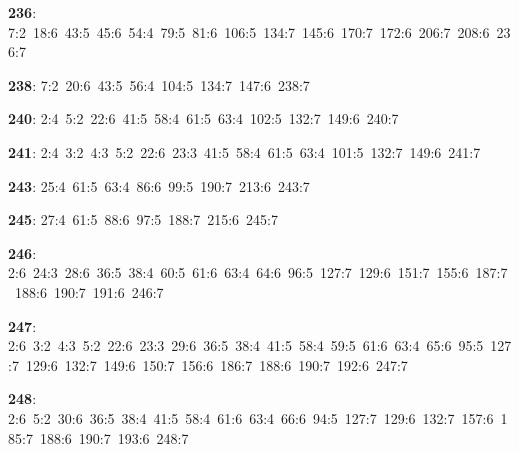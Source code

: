 \noindent \textbf{236}: 7:2\allowbreak\ 18:6\allowbreak\ 43:5\allowbreak\ 45:6\allowbreak\ 54:4\allowbreak\ 79:5\allowbreak\ 81:6\allowbreak\ 106:5\allowbreak\ 134:7\allowbreak\ 145:6\allowbreak\ 170:7\allowbreak\ 172:6\allowbreak\ 206:7\allowbreak\ 208:6\allowbreak\ 236:7\par
\noindent \textbf{238}: 7:2\allowbreak\ 20:6\allowbreak\ 43:5\allowbreak\ 56:4\allowbreak\ 104:5\allowbreak\ 134:7\allowbreak\ 147:6\allowbreak\ 238:7\par
\noindent \textbf{240}: 2:4\allowbreak\ 5:2\allowbreak\ 22:6\allowbreak\ 41:5\allowbreak\ 58:4\allowbreak\ 61:5\allowbreak\ 63:4\allowbreak\ 102:5\allowbreak\ 132:7\allowbreak\ 149:6\allowbreak\ 240:7\par
\noindent \textbf{241}: 2:4\allowbreak\ 3:2\allowbreak\ 4:3\allowbreak\ 5:2\allowbreak\ 22:6\allowbreak\ 23:3\allowbreak\ 41:5\allowbreak\ 58:4\allowbreak\ 61:5\allowbreak\ 63:4\allowbreak\ 101:5\allowbreak\ 132:7\allowbreak\ 149:6\allowbreak\ 241:7\par
\noindent \textbf{243}: 25:4\allowbreak\ 61:5\allowbreak\ 63:4\allowbreak\ 86:6\allowbreak\ 99:5\allowbreak\ 190:7\allowbreak\ 213:6\allowbreak\ 243:7\par
\noindent \textbf{245}: 27:4\allowbreak\ 61:5\allowbreak\ 88:6\allowbreak\ 97:5\allowbreak\ 188:7\allowbreak\ 215:6\allowbreak\ 245:7\par
\noindent \textbf{246}: 2:6\allowbreak\ 24:3\allowbreak\ 28:6\allowbreak\ 36:5\allowbreak\ 38:4\allowbreak\ 60:5\allowbreak\ 61:6\allowbreak\ 63:4\allowbreak\ 64:6\allowbreak\ 96:5\allowbreak\ 127:7\allowbreak\ 129:6\allowbreak\ 151:7\allowbreak\ 155:6\allowbreak\ 187:7\allowbreak\ 188:6\allowbreak\ 190:7\allowbreak\ 191:6\allowbreak\ 246:7\par
\noindent \textbf{247}: 2:6\allowbreak\ 3:2\allowbreak\ 4:3\allowbreak\ 5:2\allowbreak\ 22:6\allowbreak\ 23:3\allowbreak\ 29:6\allowbreak\ 36:5\allowbreak\ 38:4\allowbreak\ 41:5\allowbreak\ 58:4\allowbreak\ 59:5\allowbreak\ 61:6\allowbreak\ 63:4\allowbreak\ 65:6\allowbreak\ 95:5\allowbreak\ 127:7\allowbreak\ 129:6\allowbreak\ 132:7\allowbreak\ 149:6\allowbreak\ 150:7\allowbreak\ 156:6\allowbreak\ 186:7\allowbreak\ 188:6\allowbreak\ 190:7\allowbreak\ 192:6\allowbreak\ 247:7\par
\noindent \textbf{248}: 2:6\allowbreak\ 5:2\allowbreak\ 30:6\allowbreak\ 36:5\allowbreak\ 38:4\allowbreak\ 41:5\allowbreak\ 58:4\allowbreak\ 61:6\allowbreak\ 63:4\allowbreak\ 66:6\allowbreak\ 94:5\allowbreak\ 127:7\allowbreak\ 129:6\allowbreak\ 132:7\allowbreak\ 157:6\allowbreak\ 185:7\allowbreak\ 188:6\allowbreak\ 190:7\allowbreak\ 193:6\allowbreak\ 248:7\par
